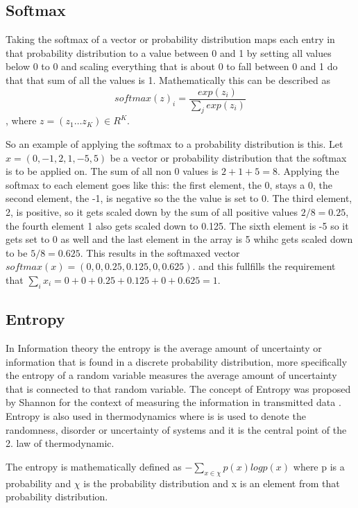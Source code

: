 \subsection{Softmax}
Taking the softmax of a vector or probability distribution maps each entry in that probability distribution to a value between 0 and 1 by setting all values below 0 to 0 and scaling everything that is about 0 to fall between 0 and 1 do that that sum of all the values is 1. 
Mathematically this can be described as $$softmax(z)_i=\frac{exp(z_i)}{\sum_j exp(z_i)}$$, where $z=(z_1\dots z_K)\in R^K$.

So an example of applying the softmax to a probability distribution is this. Let $x= (0, -1, 2, 1, -5, 5)$ be a vector or probability distribution that the softmax is to be applied on. The sum of all non 0 values is $2+1+5=8$. Applying the softmax to each element goes like this: the first element, the 0, stays a 0, the second element, the -1, is negative so the the value is set to 0. The third element, 2, is positive, so it gets scaled down by the sum of all positive values $2/8=0.25$, the fourth element 1 also gets scaled down to 0.125. The sixth element is -5 so it gets set to 0 as well and the last element in the array is 5 whihc gets scaled down to be $5/8=0.625$.
This results in the softmaxed vector $softmax(x)=(0,0,0.25,0.125,0,0.625)$. and this fullfills the requirement that $\sum_ix_i = 0+0+0.25+0.125+0+0.625= 1$. 

\subsection{Entropy}
\label{entropy}
In Information theory the entropy is the average amount of uncertainty or information that is found in a discrete probability distribution, more specifically the entropy of a random variable measures the average amount of uncertainty that is connected to that random variable.
The concept of Entropy was proposed by Shannon for the context of measuring the information in transmitted data \cite{shannonentropy}. Entropy is also used in thermodynamics where is is used to denote the randomness, disorder or uncertainty of systems and it is the central point of the 2. law of thermodynamic.

The entropy is mathematically defined as $- \sum_{x\in \chi} p(x) log p(x)$ where p is a probability and $\chi$ is the probability distribution and x is an element from that probability distribution.



